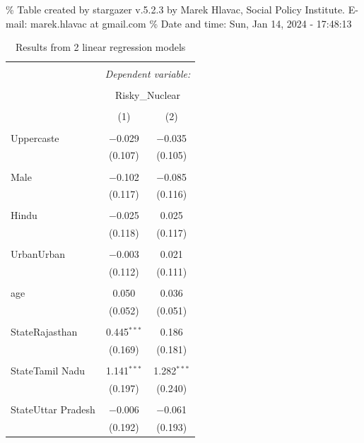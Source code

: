 \documentclass[
]{article}
\begin{document}
\begingroup\setlength{\tabcolsep}{1pt}

\renewcommand{\arraystretch}{0.7}

\% Table created by stargazer v.5.2.3 by Marek Hlavac, Social Policy
Institute. E-mail: marek.hlavac at gmail.com \% Date and time: Sun, Jan
14, 2024 - 17:48:13

\begin{table}[!htbp] \centering 
  \caption{Results from 2 linear regression models} 
  \label{} 
\begin{tabular}{@{\extracolsep{5pt}}lcc} 
\\[-1.8ex]\hline 
\hline \\[-1.8ex] 
 & \multicolumn{2}{c}{\textit{Dependent variable:}} \\ 
\cline{2-3} 
\\[-1.8ex] & \multicolumn{2}{c}{Risky\_Nuclear} \\ 
\\[-1.8ex] & (1) & (2)\\ 
\hline \\[-1.8ex] 
 Uppercaste & $-$0.029 & $-$0.035 \\ 
  & (0.107) & (0.105) \\ 
  & & \\ 
 Male & $-$0.102 & $-$0.085 \\ 
  & (0.117) & (0.116) \\ 
  & & \\ 
 Hindu & $-$0.025 & 0.025 \\ 
  & (0.118) & (0.117) \\ 
  & & \\ 
 UrbanUrban & $-$0.003 & 0.021 \\ 
  & (0.112) & (0.111) \\ 
  & & \\ 
 age & 0.050 & 0.036 \\ 
  & (0.052) & (0.051) \\ 
  & & \\ 
 StateRajasthan & 0.445$^{***}$ & 0.186 \\ 
  & (0.169) & (0.181) \\ 
  & & \\ 
 StateTamil Nadu & 1.141$^{***}$ & 1.282$^{***}$ \\ 
  & (0.197) & (0.240) \\ 
  & & \\ 
 StateUttar Pradesh & $-$0.006 & $-$0.061 \\ 
  & (0.192) & (0.193) \\ 

\end{tabular}
\end{table}
\end{document}
